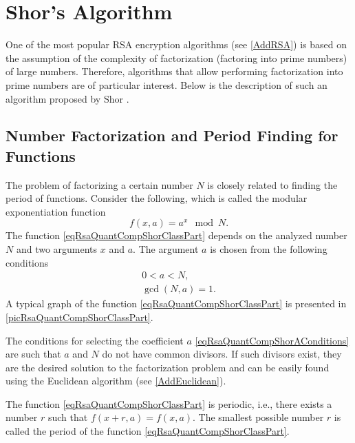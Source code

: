 \section{Shor's Algorithm}
\label{Part4QuantCompShor}
One of the most popular RSA encryption algorithms (see 
\autoref{AddRSA}) 
is based on the assumption of the complexity of factorization
(factoring into prime numbers) of large numbers. Therefore,
algorithms that allow performing factorization into prime numbers
are of particular interest. Below is the description of such
an algorithm proposed by Shor \cite{bShor94}.

\subsection{Number Factorization and Period Finding for Functions}
\label{sec:rsa:algoshor:periodfind}
The problem of factorizing a certain number $N$ is closely related to finding the period
of functions. Consider the following, which is called the modular exponentiation function
\begin{equation}
f\left(x, a\right) = a^x \mod N.
\label{eqRsaQuantCompShorClassPart}
\end{equation}
The function \eqref{eqRsaQuantCompShorClassPart} depends on
the analyzed number $N$ and two arguments $x$ and $a$. The argument $a$
is chosen from the following conditions
\begin{eqnarray}
0 < a < N,
\nonumber \\
\gcd\left(N, a\right) = 1.
\label{eqRsaQuantCompShorAConditions}
\end{eqnarray}
A typical graph of the function \eqref{eqRsaQuantCompShorClassPart} is presented in
\autoref{picRsaQuantCompShorClassPart}.




The conditions for selecting the coefficient $a$
\eqref{eqRsaQuantCompShorAConditions} are such that $a$ and $N$ do not have
common divisors. If such divisors exist, they are the desired solution to the factorization problem and can be easily found using the Euclidean algorithm (see \autoref{AddEuclidean}).

The function \eqref{eqRsaQuantCompShorClassPart} is periodic,
i.e., there exists a number $r$ such that $f\left(x + r, a\right) = 
f\left(x, a\right)$. The smallest possible number $r$ is called
the period of the function \eqref{eqRsaQuantCompShorClassPart}. 

